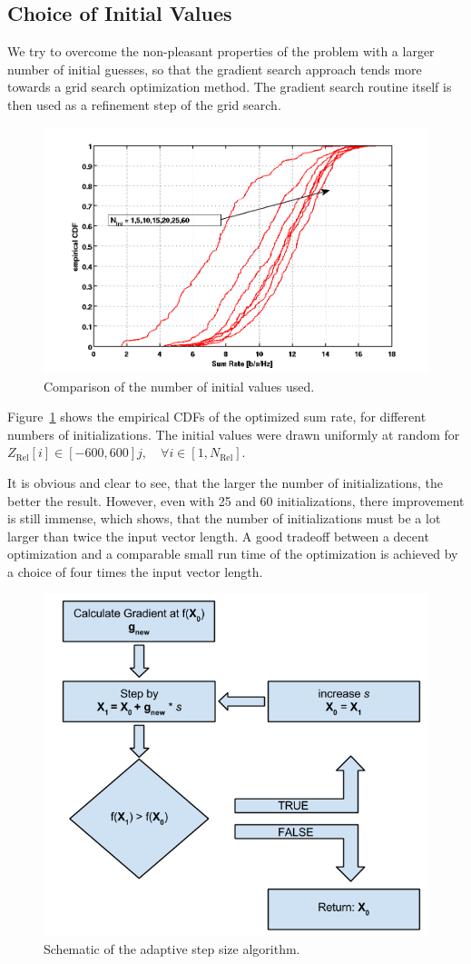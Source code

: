 \subsection{Choice of Initial Values}
\label{sec:grads_ini}
We try to overcome the non-pleasant properties of the problem with a larger number of initial guesses, so that the gradient search approach tends more towards a grid search optimization method.
The gradient search routine itself is then used as a refinement step of the grid search.
\begin{figure}[h]
\centering
  \includegraphics[width=0.9\linewidth]{images/Inicomparison_edited.png}
\caption{Comparison of the number of initial values used.}
\label{fig:ini_comp}
\end{figure}


Figure~\ref{fig:ini_comp} shows the empirical CDFs of the optimized sum rate, for different numbers of initializations.
The initial values were drawn uniformly at random for $Z_{\text{Rel}}[i]\in[-600,600] j , \quad\forall i\in[1,N_{\text{Rel}}]$.

It is obvious and clear to see, that the larger the number of initializations, the better the result.
However, even with 25 and 60 initializations, there improvement is still immense, which shows, that the number of initializations must be a lot larger than twice the input vector length.
A good tradeoff between a decent optimization and a comparable small run time of the optimization is achieved by a choice of four times the input vector length.
\begin{figure}[h]
\centering
  \includegraphics[width=0.5\linewidth]{images/stepsize_scheme.png}
\caption{Schematic of the adaptive step size algorithm.}
\label{fig:stepsize}
\end{figure}

